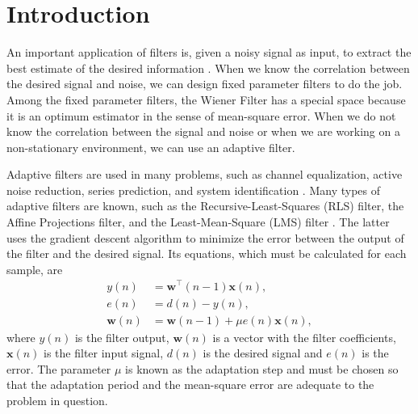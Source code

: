 \chapter{Introduction}

An important application of filters is, given a noisy signal as input, to extract the best estimate of the desired information \cite{haykin_adaptive_1996}. 
When we know the correlation between the desired signal and noise, we can design fixed parameter filters to do the job. Among the fixed parameter filters, the 
Wiener Filter \cite{haykin_adaptive_1996,sayed_adaptive_2008,manolakis_statistical_2005} has a special space because it is an optimum estimator in the sense of 
mean-square error. When we do not know the correlation between the signal and noise or when we are working on a non-stationary environment, we can use an adaptive 
filter.

Adaptive filters are used in many problems, such as channel equalization, active noise reduction, series prediction, and system identification \cite{haykin_adaptive_1996,sayed_adaptive_2008,manolakis_statistical_2005}.
 Many types of adaptive filters are known, such as the Recursive-Least-Squares (RLS) filter, the Affine Projections filter, and the Least-Mean-Square (LMS) filter 
 \cite{haykin_adaptive_1996,sayed_adaptive_2008,manolakis_statistical_2005}. The latter uses the gradient descent algorithm to minimize the error between the output of 
 the filter and the desired signal. Its equations, which must be calculated for each sample, are
\begin{align}
    y(n) &= \mathbf{w}^{\top}(n-1)\mathbf{x}(n),\\
    e(n) &= d(n) - y(n),\\
    \mathbf{w}(n) &= \mathbf{w}(n-1) + \mu e(n)\mathbf{x}(n),
\end{align}
where $y(n)$ is the filter output, $\mathbf{w}(n)$ is a vector with the filter coefficients, $\mathbf{x}(n)$ is the filter input signal, $d(n)$ is the desired signal and $e(n)$ is 
the error. The parameter $\mu$ is known as the adaptation step and must be chosen so that the adaptation period and the mean-square error are adequate to the problem 
in question.

